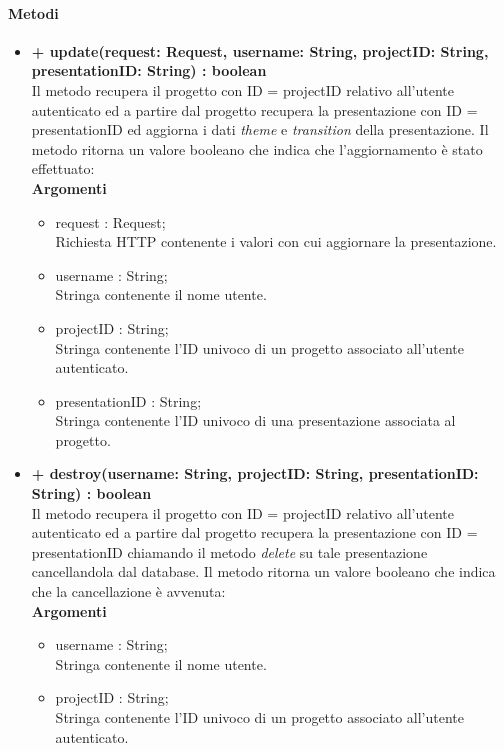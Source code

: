 	\paragraph{Metodi}
		\begin{itemize}
			\item \textbf{+ update(request: Request, username: String, projectID: String, presentationID: String) : boolean}\\
			Il metodo recupera il progetto con ID = projectID relativo all'utente autenticato ed a partire dal progetto recupera la presentazione con ID = presentationID ed aggiorna i dati \textit{theme} e \textit{transition} della presentazione. Il metodo ritorna un valore booleano che indica che l'aggiornamento è stato effettuato:\\
			\textbf{Argomenti}
			\begin{itemize}
				\item request : Request;\\
				Richiesta HTTP contenente i valori con cui aggiornare la presentazione.
				\item username : String; \\
				Stringa contenente il nome utente.
				\item projectID : String; \\
				Stringa contenente l'ID univoco di un progetto associato all'utente autenticato.
				\item presentationID : String; \\
				Stringa contenente l'ID univoco di una presentazione associata al progetto.
			\end{itemize}
			\newpage
			\item \textbf{+ destroy(username: String, projectID: String, presentationID: String) : boolean}\\
			Il metodo recupera il progetto con ID = projectID relativo all'utente autenticato ed a partire dal progetto recupera la presentazione con ID = presentationID chiamando il metodo \textit{delete} su tale presentazione cancellandola dal \gls{database}. Il metodo ritorna un valore booleano che indica che la cancellazione è avvenuta:\\
			\textbf{Argomenti}
			\begin{itemize}
				\item username : String; \\
				Stringa contenente il nome utente.
				\item projectID : String; \\
				Stringa contenente l'ID univoco di un progetto associato all'utente autenticato.

\end{itemize}
\end{itemize}
